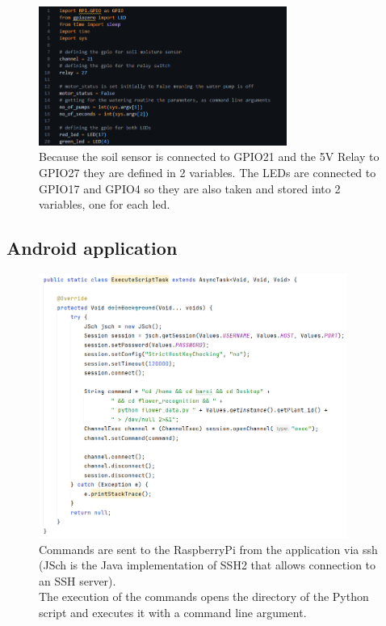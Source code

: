 \documentclass[12pt]{article}
\begin{document}
\begin{figure}[ht]
    \centering
    \includegraphics[width=0.725\textwidth]{images/image9.png}
    \caption{Because the soil sensor is connected to GPIO21 and the 5V Relay to GPIO27 they are defined in 2 variables.
    The LEDs are connected to GPIO17 and GPIO4 so they are also taken and stored into 2 variables, one for each led.}
    \label{fig:pic9}

\end{figure} 

\newpage

\subsection{Android application}

\begin{figure}[ht]
    \centering
    \includegraphics[width=0.9\textwidth]{images/image4.png}
    \caption{Commands are sent to the RaspberryPi from the application via ssh (JSch is the Java implementation of SSH2 that allows connection to an SSH server). \\
    The execution of the commands opens the directory of the Python script and executes it with a command line argument.}
    \label{fig:pic1}
\end{figure}  
\end{document}

